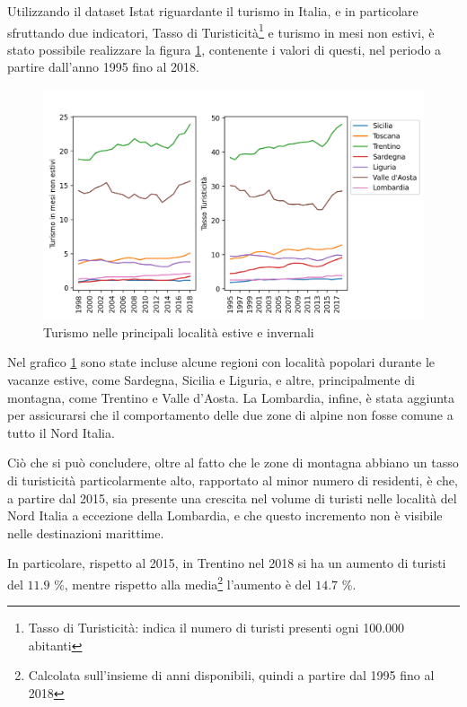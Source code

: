 \documentclass[a4paper,12pt]{report}
\begin{document}
Utilizzando il dataset Istat riguardante il turismo in Italia, e in 
particolare sfruttando due indicatori, Tasso di 
Turisticità\footnote{Tasso di Turisticità: indica il numero di turisti 
presenti ogni 100.000 abitanti\cite{ONTIT:1}} 
e turismo in mesi non estivi, è stato possibile realizzare 
la figura \ref{fig:turismo}, 
contenente i valori di questi, nel periodo a partire dall'anno 1995 fino al 2018. 

\begin{figure}
    \includegraphics[width=\linewidth]{../src/turismo/turismo.png}
    \caption{Turismo nelle principali località estive e invernali}
    \label{fig:turismo}
\end{figure}

Nel grafico \ref{fig:turismo} sono state incluse alcune regioni con località popolari 
durante le vacanze estive, come Sardegna, Sicilia e Liguria, e altre, principalmente 
di montagna, come Trentino e Valle d'Aosta. 
La Lombardia, infine, è stata aggiunta per assicurarsi che il comportamento delle due zone 
di alpine non fosse comune a tutto il Nord Italia. 

Ciò che si può concludere, oltre al fatto che le zone di montagna abbiano 
un tasso di turisticità particolarmente alto, rapportato al minor numero di residenti,
è che, a partire dal 2015, sia presente una crescita nel volume di turisti nelle località 
del Nord Italia a eccezione della Lombardia, e che questo incremento non è visibile nelle 
destinazioni marittime. 

In particolare, rispetto al 2015, in Trentino nel 2018 si ha un aumento 
di turisti del $11.9$ \%, mentre rispetto alla 
media\footnote{Calcolata sull'insieme di anni disponibili, quindi 
a partire dal 1995 fino al 2018} l'aumento è del $14.7$ \%. 
\end{document}
